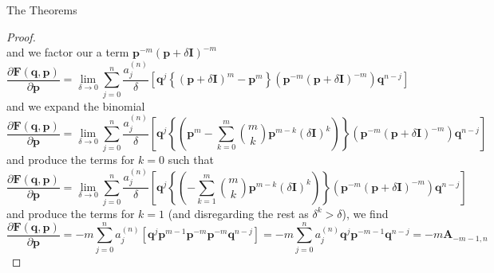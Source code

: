 \documentclass[aspectratio=169]{beamer}
\begin{document}
\begin{frame}[allowframebreaks]{The Theorems}
\begin{proof}
\begin{equation}
			\end{equation}
			and we factor our a term $\textbf{p}^{-m}(\textbf{p}+\delta\textbf{I})^{-m}$
			\begin{equation}
				\frac{\partial \textbf{F}(\textbf{q},\textbf{p})}{\partial \textbf{p}}=\lim_{\delta\to0}\sum_{j=0}^n\frac{a_j^{(n)}}{\delta}\left[\textbf{q}^j\left\{(\textbf{p}+\delta\textbf{I})^{m}-\textbf{p}^{m}\right\}(\textbf{p}^{-m}(\textbf{p}+\delta\textbf{I})^{-m})\textbf{q}^{n-j}\right]
			\end{equation}
			and we expand the binomial
			\begin{equation}
				\frac{\partial \textbf{F}(\textbf{q},\textbf{p})}{\partial \textbf{p}}=\lim_{\delta\to0}\sum_{j=0}^n\frac{a_j^{(n)}}{\delta}\left[\textbf{q}^j\left\{\left(\textbf{p}^{m}-\sum_{k=0}^m\binom{m}{k}\textbf{p}^{m-k}(\delta\textbf{I})^k\right)\right\}(\textbf{p}^{-m}(\textbf{p}+\delta\textbf{I})^{-m})\textbf{q}^{n-j}\right]
			\end{equation}
			and produce the terms for $k=0$ such that
			\begin{equation}
				\frac{\partial \textbf{F}(\textbf{q},\textbf{p})}{\partial \textbf{p}}=\lim_{\delta\to0}\sum_{j=0}^n\frac{a_j^{(n)}}{\delta}\left[\textbf{q}^j\left\{\left(-\sum_{k=1}^m\binom{m}{k}\textbf{p}^{m-k}(\delta\textbf{I})^k\right)\right\}(\textbf{p}^{-m}(\textbf{p}+\delta\textbf{I})^{-m})\textbf{q}^{n-j}\right]
			\end{equation}
			and produce the terms for $k=1$ (and disregarding the rest as $\delta^k>\delta$), we find
			\begin{equation}
				\frac{\partial \textbf{F}(\textbf{q},\textbf{p})}{\partial \textbf{p}}=-m\sum_{j=0}^na_j^{(n)}\left[\textbf{q}^j\textbf{p}^{m-1}\textbf{p}^{-m}\textbf{p}^{-m}\textbf{q}^{n-j}\right]=-m\sum_{j=0}^na_j^{(n)}\textbf{q}^j\textbf{p}^{-m-1}\textbf{q}^{n-j}=-m\textbf{A}_{-m-1,n}
			\end{equation}
		\end{proof}
		

\end{frame}
\end{document}
